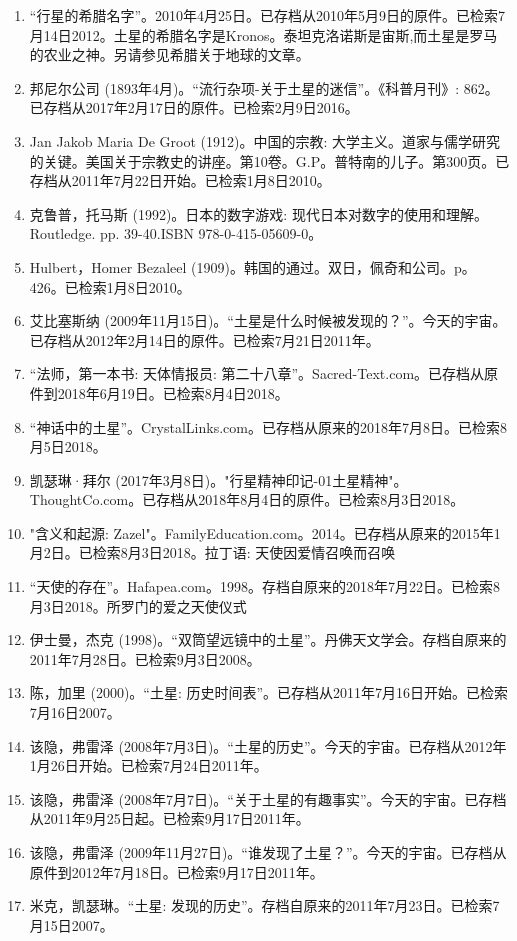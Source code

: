 \begin{enumerate}
\item “行星的希腊名字”。2010年4月25日。已存档从2010年5月9日的原件。已检索7月14日2012。土星的希腊名字是Kronos。泰坦克洛诺斯是宙斯,而土星是罗马的农业之神。另请参见希腊关于地球的文章。
\item 邦尼尔公司 (1893年4月)。“流行杂项-关于土星的迷信”。《科普月刊》: 862。已存档从2017年2月17日的原件。已检索2月9日2016。
\item Jan Jakob Maria De Groot (1912)。中国的宗教: 大学主义。道家与儒学研究的关键。美国关于宗教史的讲座。第10卷。G.P。普特南的儿子。第300页。已存档从2011年7月22日开始。已检索1月8日2010。
\item 克鲁普，托马斯 (1992)。日本的数字游戏: 现代日本对数字的使用和理解。Routledge. pp. 39-40.ISBN 978-0-415-05609-0。
\item Hulbert，Homer Bezaleel (1909)。韩国的通过。双日，佩奇和公司。p。 426。已检索1月8日2010。
\item 艾比塞斯纳 (2009年11月15日)。“土星是什么时候被发现的？”。今天的宇宙。已存档从2012年2月14日的原件。已检索7月21日2011年。
\item “法师，第一本书: 天体情报员: 第二十八章”。Sacred-Text.com。已存档从原件到2018年6月19日。已检索8月4日2018。
\item“神话中的土星”。CrystalLinks.com。已存档从原来的2018年7月8日。已检索8月5日2018。
\item 凯瑟琳·拜尔 (2017年3月8日)。"行星精神印记-01土星精神"。ThoughtCo.com。已存档从2018年8月4日的原件。已检索8月3日2018。
\item "含义和起源: Zazel"。FamilyEducation.com。2014。已存档从原来的2015年1月2日。已检索8月3日2018。拉丁语: 天使因爱情召唤而召唤
\item “天使的存在”。Hafapea.com。1998。存档自原来的2018年7月22日。已检索8月3日2018。所罗门的爱之天使仪式
\item 伊士曼，杰克 (1998)。“双筒望远镜中的土星”。丹佛天文学会。存档自原来的2011年7月28日。已检索9月3日2008。
\item 陈，加里 (2000)。“土星: 历史时间表”。已存档从2011年7月16日开始。已检索7月16日2007。
\item 该隐，弗雷泽 (2008年7月3日)。“土星的历史”。今天的宇宙。已存档从2012年1月26日开始。已检索7月24日2011年。
\item 该隐，弗雷泽 (2008年7月7日)。“关于土星的有趣事实”。今天的宇宙。已存档从2011年9月25日起。已检索9月17日2011年。
\item 该隐，弗雷泽 (2009年11月27日)。“谁发现了土星？”。今天的宇宙。已存档从原件到2012年7月18日。已检索9月17日2011年。
\item 米克，凯瑟琳。“土星: 发现的历史”。存档自原来的2011年7月23日。已检索7月15日2007。

\end{enumerate}
